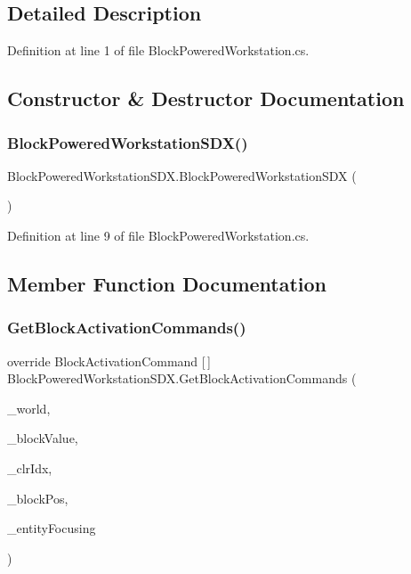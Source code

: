 \subsection{Detailed Description}


Definition at line 1 of file Block\+Powered\+Workstation.\+cs.



\subsection{Constructor \& Destructor Documentation}
\mbox{\label{class_block_powered_workstation_s_d_x_afed7f31e6bd7d45885b86ff818ffbf6d}} 
\subsubsection{\texorpdfstring{BlockPoweredWorkstationSDX()}{BlockPoweredWorkstationSDX()}}
{\footnotesize\ttfamily Block\+Powered\+Workstation\+S\+D\+X.\+Block\+Powered\+Workstation\+S\+DX (\begin{DoxyParamCaption}{ }\end{DoxyParamCaption})}



Definition at line 9 of file Block\+Powered\+Workstation.\+cs.



\subsection{Member Function Documentation}
\mbox{\label{class_block_powered_workstation_s_d_x_a3faadfd678821f8a708299a5d5d5a9a9}} 
\subsubsection{\texorpdfstring{GetBlockActivationCommands()}{GetBlockActivationCommands()}}
{\footnotesize\ttfamily override Block\+Activation\+Command \mbox{[}$\,$\mbox{]} Block\+Powered\+Workstation\+S\+D\+X.\+Get\+Block\+Activation\+Commands (\begin{DoxyParamCaption}\item[{World\+Base}]{\+\_\+world,  }\item[{Block\+Value}]{\+\_\+block\+Value,  }\item[{int}]{\+\_\+clr\+Idx,  }\item[{Vector3i}]{\+\_\+block\+Pos,  }\item[{Entity\+Alive}]{\+\_\+entity\+Focusing }\end{DoxyParamCaption})}



